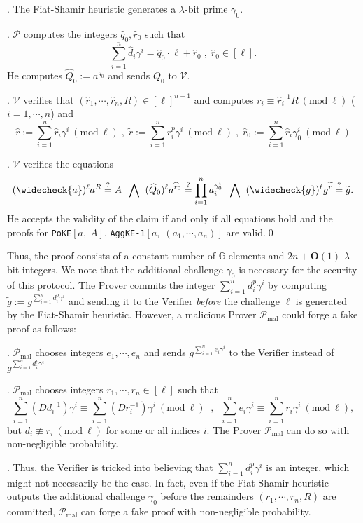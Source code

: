 \documentclass[11pt, lettersize, notitlepage, leqno, footskip=0.6cm]{article}
\newcommand{\pl}{\prod\limits}
\newcommand{\slim}{\sum\limits}
\newcommand{\wti}{\widetilde}
\newcommand{\mc}{\mathcal}
\newcommand{\mb}{\mathbb}
\newcommand{\mbf}{\mathbf}
\newcommand{\mr}{\mathrm}
\newcommand{\lam}{\lambda}
\newcommand{\what}{\widehat}
\newcommand{\weck}{\widecheck}
\newcommand{\bO}{\mbf{O}}
\newcommand{\mP}{\mc{P}}
\newcommand{\vs}{\vspace{-0.15cm}}
\newcommand{\noin}{\noindent}
\newcommand{\sta}{\stackrel{?}{=}}
\newcommand{\Mod}[1]{\ (\mathrm{mod}\ #1)}
\numberwithin{equation}{section}
\begin{document}
\begin{enumerate}[wide, labelwidth=!, labelindent=0pt]
\noin 9. The Fiat-Shamir heuristic generates a $\lam$-bit prime $\gamma_{0}$.

\noin 10. $\mc{P}$ computes the integers $\what{q}_0,\what{r}_0$ such that \vs $$\slim_{i=1}^n \what{d}_i\gamma^i = \what{q}_0 \cdot \ell+\what{r}_0\;,\;\what{r}_0\in[\ell].$$ He computes $\what{Q}_0:= a^{q_0}$ and sends ${Q}_0$ to $\mc{V}$.

\noin 11. $\mc{V}$ verifies that $(\what{r}_1,\cdots,\what{r}_n, R)\in [\ell]^{n+1}$ and computes $r_i\equiv \what{r}_i^{-1}R\Mod{\ell}$ ($i=1,\cdots,n$) and \vs $$\what{r}:= \slim_{i=1}^n \what{r}_i\gamma^i\Mod{\ell}\;,\;\wti{r}:= {\slim_{i=1}^n r_i^{p}\gamma^i}\Mod{\ell}\;,\; \what{r}_0:= \slim_{i=1}^n \what{r}_i\gamma_{0}^i\Mod{\ell}$$

\noin 12. $\mc{V}$ verifies the equations \vs $$(\weck{a})^{\ell}a^R\sta A \; \;\bigwedge\;\;(\what{Q}_0)^{\ell}a^{\what{r}_0}\sta \pl_{i=1}^{n} a_i^{\gamma_{0}^i} \;\;\bigwedge\;\; (\weck{g})^{\ell}g^{\wti{r}} \sta \wti{g}.$$ He accepts the validity of the claim if and only if all equations hold and the proofs for \verb|PoKE|$[a,\;A]$, \verb|AggKE-1|$[a,\;(a_1,\cdots,a_n)]$ are valid.\qed \end{enumerate}

\vspace{0.2cm}

Thus, the proof consists of a constant number of $\mb{G}$-elements and $2n+\bO(1)$ $\lam$-bit integers. We note that the additional challenge $\gamma_{0}$ is necessary for the security of this protocol. The Prover commits the integer $\slim_{i=1}^n d_i^{p}\gamma^i$ by computing $\wti{g} := g^{\slim_{i=1}^n d_i^{p}\gamma^i}$ and sending it to the Verifier \textit{before} the challenge $\ell$ is generated by the Fiat-Shamir heuristic. However, a malicious Prover $\mP_{\mr{mal}}$ could forge a fake proof as follows:

\noin 1. $\mP_{\mr{mal}}$ chooses integers $e_1,\cdots,e_n$ and sends $g^{\slim_{i=1}^n e_i\gamma^i}$ to the Verifier instead of $g^{\slim_{i=1}^n d_i^{p}\gamma^i}$

\noin 2. $\mP_{\mr{mal}}$ chooses integers $r_1,\cdots,r_n\in [\ell]$ such that \vs $$\slim_{i=1}^n (Dd_i^{-1})\gamma^i \equiv \slim_{i=1}^n (Dr_i^{-1})\gamma^i \Mod{\ell}\;\;,\;\; \slim_{i=1}^n e_i\gamma^i\equiv \slim_{i=1}^n r_i\gamma^i \Mod{\ell},$$ but $d_i\not\equiv r_i\Mod{\ell}$ for some or all indices $i$. The Prover $\mP_{\mr{mal}}$ can do so  with non-negligible probability.

\noin 3. Thus, the Verifier is tricked into believing that $\slim_{i=1}^n d_i^{p}\gamma^i$ is an integer, which  might not necessarily be the case. In fact, even if the Fiat-Shamir heuristic outputs the additional challenge $\gamma_{0}$ before the remainders $(r_1,\cdots,r_n, R)$ are committed, $\mP_{\mr{mal}}$ can forge a fake proof with non-negligible probability. 
\end{document}
